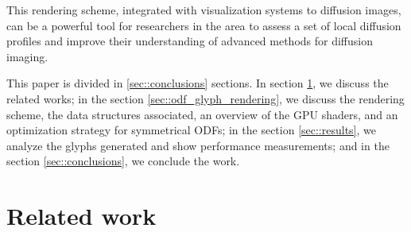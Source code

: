 \documentclass[twoside,twocolumn,10pt]{article}
\begin{document}

This rendering scheme, integrated with visualization systems to diffusion images, can be a powerful tool for researchers in the area to assess a set of local diffusion profiles and improve their understanding of advanced methods for diffusion imaging.

This paper is divided in \ref{sec::conclusions} sections. In section \ref{sec::related_work}, we discuss the related works; in the section \ref{sec::odf_glyph_rendering}, we discuss the rendering scheme, the data structures associated, an overview of the GPU shaders, and an optimization strategy for symmetrical ODFs; in the section \ref{sec::results}, we analyze the glyphs generated and show performance measurements; and in the section \ref{sec::conclusions}, we conclude the work.








\section{Related work}
\label{sec::related_work}
\end{document}

